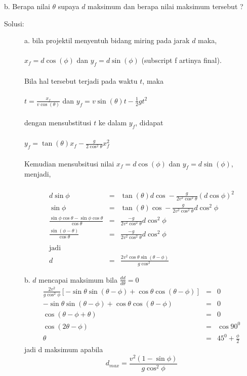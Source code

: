 b. Berapa nilai $\theta$ supaya $d$ maksimum dan berapa nilai maksimum tersebut ?
\begin{description}
\item[Solusi:]
a. bila projektil menyentuh bidang miring pada jarak $d$ maka, \\ \\$x_{f}=d \cos\left(\phi\right)$ dan $y_{f}=d \sin\left(\phi\right)$ (subscript f artinya final). \\ \\
Bila hal tersebut terjadi pada waktu $t$, maka \\ \\ $t=\frac{x_{f}}{v \cos\left(\theta\right)}$ dan $y_{f}=v \sin\left(\theta\right) t-\frac{1}{2}g t^{2}$ \\ \\
dengan mensubstitusi $t$ ke dalam $y_{f}$, didapat \\ \\
$y_{f}=\tan\left(\theta\right) x_{f}-\frac{g }{2 \cos^{2} \theta}x_{f}^{2}  $\\ \\
Kemudian mensubsitusi nilai $x_{f}=d \cos\left(\phi\right)$ dan $y_{f}=d \sin\left(\phi\right)$, menjadi, \\ \\
\begin{eqnarray*}
d \sin \phi &=& \tan\left(\theta\right) d \cos-\frac{g }{2 v^{2} \cos^{2} \theta}\left(d \cos \phi\right)^{2} \\
 \sin \phi &=& \tan\left(\theta\right) \cos-\frac{g }{2 v^{2} \cos^{2} \theta} d  \cos^{2} \phi \\
 \frac{\sin \phi \cos \theta-\sin \phi \cos \theta}{\cos \theta} &=& \frac{-g}{2 v^2 \cos^2 \theta} d \cos^{2} \phi \\
 \frac{\sin \left(\phi-\theta\right)}{\cos \theta}&=& \frac{-g}{2 v^2 \cos^2 \theta} d \cos^{2} \phi \\ \\
 \mbox{jadi} \\
  d&=&\frac{2 v^2 \cos \theta \sin \left(\theta-\phi\right)}{g \cos^{2} }
\end{eqnarray*}

b. $d$ mencapai maksimum bila $\frac{d d}{d \theta}=0$
\begin{eqnarray*}
\frac{2 v^{2}}{g \cos^{2} \phi}\left[-\sin \theta \sin \left(\theta-\phi\right)+\cos \theta \cos\left(\theta-\phi\right)\right] &=& 0 \\
-\sin \theta \sin \left(\theta-\phi\right)+\cos \theta \cos\left(\theta-\phi\right) &=& 0 \\
\cos \left(\theta-\phi+\theta\right) &=& 0 \\
\cos \left(2\theta-\phi\right) &=& \cos 90^{0} \\
\theta &=& 45^{0}+\frac{\phi}{2}
\end{eqnarray*}
jadi d maksimum apabila
\begin{equation}
d_{max}=\frac{v^{2}\left(1-\sin \phi\right)}{g \cos^{2} \phi}
\end{equation}

\end{description}
